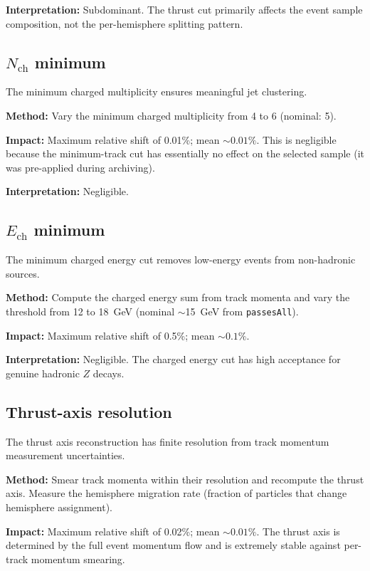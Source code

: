 \documentclass[11pt,a4paper]{article}
\begin{document}
\textbf{Interpretation:} Subdominant.  The thrust cut primarily
affects the event sample composition, not the per-hemisphere splitting
pattern.

\subsection{$N_\text{ch}$ minimum}
\label{sec:syst-nch}

The minimum charged multiplicity ensures meaningful jet clustering.

\textbf{Method:} Vary the minimum charged multiplicity from 4 to 6
(nominal: 5).

\textbf{Impact:} Maximum relative shift of 0.01\%; mean $\sim\!0.01\%$.
This is negligible because the minimum-track cut has essentially no
effect on the selected sample (it was pre-applied during archiving).

\textbf{Interpretation:} Negligible.

\subsection{$E_\text{ch}$ minimum}
\label{sec:syst-ech}

The minimum charged energy cut removes low-energy events from
non-hadronic sources.

\textbf{Method:} Compute the charged energy sum from track momenta
and vary the threshold from 12 to 18~GeV (nominal $\sim$15~GeV from
\texttt{passesAll}).

\textbf{Impact:} Maximum relative shift of 0.5\%; mean $\sim\!0.1\%$.

\textbf{Interpretation:} Negligible.  The charged energy cut has
high acceptance for genuine hadronic $Z$ decays.

\subsection{Thrust-axis resolution}
\label{sec:syst-thrust-axis}

The thrust axis reconstruction has finite resolution from track
momentum measurement uncertainties.

\textbf{Method:} Smear track momenta within their resolution and
recompute the thrust axis.  Measure the hemisphere migration rate
(fraction of particles that change hemisphere assignment).

\textbf{Impact:} Maximum relative shift of 0.02\%; mean $\sim\!0.01\%$.
The thrust axis is determined by the full event momentum flow and
is extremely stable against per-track momentum smearing.
\end{document}
